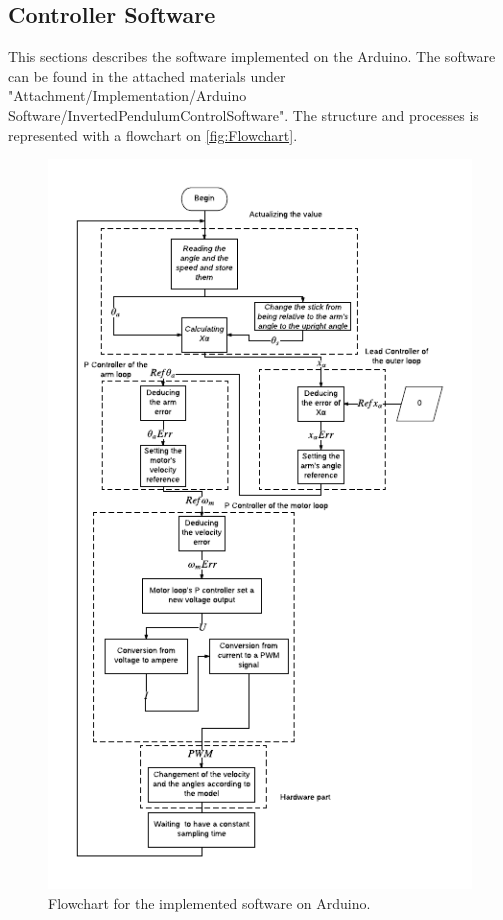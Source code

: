 

\subsection{Controller Software}
This sections describes the software implemented on the Arduino.  The software can be found in the attached materials under "Attachment/Implementation/Arduino Software/InvertedPendulumControlSoftware". The structure and processes is represented with a flowchart on \autoref{fig:Flowchart}.   
\begin{figure}[htbp]
\centering
\includegraphics[width=1\linewidth]{figures/Flowchart.pdf}
\caption{Flowchart for the implemented software on Arduino.}
\label{fig:Flowchart}
\end{figure}
\newpage

